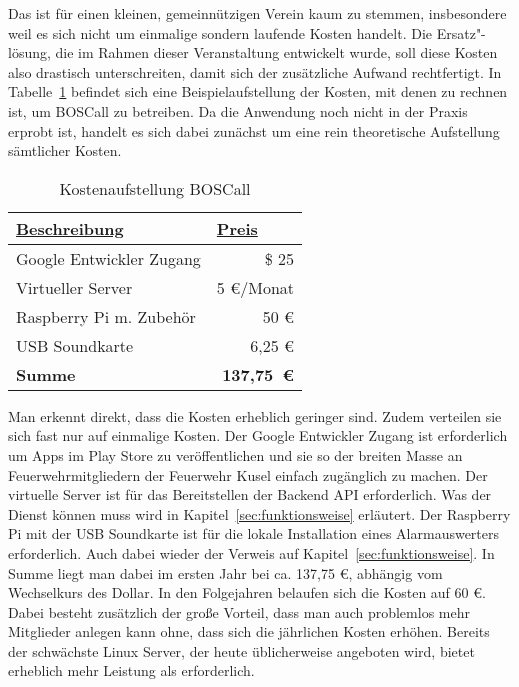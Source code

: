 Das ist für einen kleinen, gemeinnützigen Verein kaum zu stemmen, insbesondere weil es sich nicht um einmalige sondern laufende Kosten handelt. Die Ersatz"-lösung, die im Rahmen dieser Veranstaltung entwickelt wurde, soll diese Kosten also drastisch unterschreiten, damit sich der zusätzliche Aufwand rechtfertigt. In Tabelle~\ref{tbl:BOSCallPricing} befindet sich eine Beispielaufstellung der Kosten, mit denen zu rechnen ist, um BOSCall zu betreiben. Da die Anwendung noch nicht in der Praxis erprobt ist, handelt es sich dabei zunächst um eine rein theoretische Aufstellung sämtlicher Kosten.

\begin{table}[H]
	\centering
	\caption{Kostenaufstellung BOSCall}
	\label{tbl:BOSCallPricing}
	\begin{tabular}{|l|r|}
		\hline
		{\ul \textbf{Beschreibung}} & \multicolumn{1}{l|}{{\ul \textbf{Preis}}} \\ \hline
		Google Entwickler Zugang    & \$ 25                                     \\ \hline
		Virtueller Server           & 5 €/Monat                                 \\ \hline
		Raspberry Pi m. Zubehör     & 50 €                                      \\ \hline
		USB Soundkarte              & 6,25 €                                    \\ \hline \hline
		\textbf{Summe}                  & \textbf{137,75~€}                                  \\ \hline
	\end{tabular}
\end{table}

Man erkennt direkt, dass die Kosten erheblich geringer sind. Zudem verteilen sie sich fast nur auf einmalige Kosten. Der Google Entwickler Zugang ist erforderlich um Apps im Play Store zu veröffentlichen und sie so der breiten Masse an Feuerwehrmitgliedern der Feuerwehr Kusel einfach zugänglich zu machen. Der virtuelle Server ist für das Bereitstellen der Backend API erforderlich. Was der Dienst können muss wird in Kapitel~\ref{sec:funktionsweise} erläutert.  Der Raspberry Pi mit der USB Soundkarte ist für die lokale Installation eines Alarmauswerters erforderlich. Auch dabei wieder der Verweis auf Kapitel~\ref{sec:funktionsweise}. In Summe liegt man dabei im ersten Jahr bei ca. 137,75 €, abhängig vom Wechselkurs des Dollar. In den Folgejahren belaufen sich die Kosten auf 60 €. Dabei besteht zusätzlich der große Vorteil, dass man auch problemlos mehr Mitglieder anlegen kann ohne, dass sich die jährlichen Kosten erhöhen. Bereits der schwächste Linux Server, der heute üblicherweise angeboten wird, bietet erheblich mehr Leistung als erforderlich.